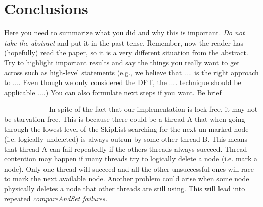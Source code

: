 \section{Conclusions}

Here you need to summarize what you did and why this is
important. {\em Do not take the abstract} and put it in the past
tense. Remember, now the reader has (hopefully) read the paper, so it
is a very different situation from the abstract. Try to highlight
important results and say the things you really want to get across
such as high-level statements (e.g., we believe that .... is the right
approach to .... Even though we only considered the DFT, the
.... technique should be applicable ....) You can also formulate next
steps if you want. Be brief


------------------
In spite of the fact that our implementation is lock-free, it may not be starvation-free. 
This is because there could be a thread A that when going through the lowest level 
of the SkipList searching for the next un-marked node (i.e. logically undeleted) is always 
outrun by some other thread B. This means that thread A can fail repeatedly if the others
threads always succeed.
Thread contention may happen if many threads try to logically delete a node (i.e. mark
a node). Only one thread will succeed and all the other unsuccessful ones will race to mark 
the next available node. Another problem could arise when some node physically deletes a
node that other threads are still using. This will lead into repeated \it{compareAndSet} failures.

